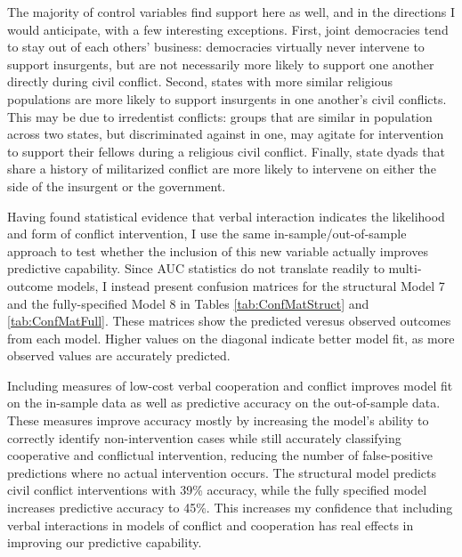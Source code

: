 \documentclass[10pt,]{article}
\begin{document}
The majority of control variables find support here as well, and in the
directions I would anticipate, with a few interesting exceptions. First,
joint democracies tend to stay out of each others' business: democracies
virtually never intervene to support insurgents, but are not necessarily
more likely to support one another directly during civil conflict.
Second, states with more similar religious populations are more likely
to support insurgents in one another's civil conflicts. This may be due
to irredentist conflicts: groups that are similar in population across
two states, but discriminated against in one, may agitate for
intervention to support their fellows during a religious civil conflict.
Finally, state dyads that share a history of militarized conflict are
more likely to intervene on either the side of the insurgent or the
government.

Having found statistical evidence that verbal interaction indicates the
likelihood and form of conflict intervention, I use the same
in-sample/out-of-sample approach to test whether the inclusion of this
new variable actually improves predictive capability. Since AUC
statistics do not translate readily to multi-outcome models, I instead
present confusion matrices for the structural Model 7 and the
fully-specified Model 8 in Tables \ref{tab:ConfMatStruct} and
\ref{tab:ConfMatFull}. These matrices show the predicted veresus
observed outcomes from each model. Higher values on the diagonal
indicate better model fit, as more observed values are accurately
predicted.

Including measures of low-cost verbal cooperation and conflict improves
model fit on the in-sample data as well as predictive accuracy on the
out-of-sample data. These measures improve accuracy mostly by increasing
the model's ability to correctly identify non-intervention cases while
still accurately classifying cooperative and conflictual intervention,
reducing the number of false-positive predictions where no actual
intervention occurs. The structural model predicts civil conflict
interventions with 39\% accuracy, while the fully specified model
increases predictive accuracy to 45\%. This increases my confidence that
including verbal interactions in models of conflict and cooperation has
real effects in improving our predictive capability.

\newpage
\end{document}

